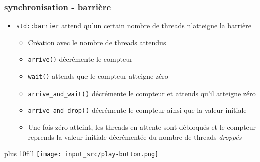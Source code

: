 \documentclass[C++.tex]{subfiles}
\begin{document}
\begin{frame}[fragile]
	\frametitle{synchronisation - barrière}
	\begin{itemize}
		\item \lstinline|std::barrier| attend qu'un certain nombre de threads n'atteigne la barrière
		\begin{itemize}
			\item Création avec le nombre de threads attendus
			\item \lstinline|arrive()| décrémente le compteur
			\item \lstinline|wait()| attends que le compteur atteigne zéro
			\item \lstinline|arrive_and_wait()| décrémente le compteur et attends qu'il atteigne zéro
			\item \lstinline|arrive_and_drop()| décrémente le compteur ainsi que la valeur initiale
			\item Une fois zéro atteint, les threads en attente sont débloqués et le compteur reprends la valeur initiale décrémentée du nombre de threads \og \textit{droppés}\fg{}
		\end{itemize}
	\end{itemize}

	\vskip 10mm plus 10fill
	\hfill
	\href{https://godbolt.org/#z:OYLghAFBqd5QCxAYwPYBMCmBRdBLAF1QCcAaPECAMzwBtMA7AQwFtMQByARg9KtQYEAysib0QXACx8BBAKoBnTAAUAHpwAMvAFYTStJg1DIApACYAQuYukl9ZATwDKjdAGFUtAK4sGe1wAyeAyYAHI%2BAEaYxCBmAGykAA6oCoRODB7evnrJqY4CQSHhLFEx8baY9vkMQgRMxASZPn5cFVXptfUEhWGR0XoKdQ1N2a2DXT3FpRIAlLaoXsTI7BzmAMzByN5YANQma25Og8SYrPvYJhoAguub25h7BxH1xHjR55c3ZhsMW167%2BzcBAQJyY6A%2B10%2BwQIOxYTGCEBmnxMAHYrNcdjs0AxBjtUgAvTAAfRhDAijwAIjsAKz7dFXTGDdAgEDPYivaI7CIQMlItb0z6YpheIg7ADuJAA1pS9tSrPETNSqRBoTs8EiMZitdrtaj6TqDTqmSy0CLHm5AXszGZsIITg9%2BKhzGZzZa8K6DlazIq3AxnXTBYagxEAHQvPAAN2JhnQRLF8IIiIDmqDBuNKAWMMBludAFk6G8vDtHc6PW41WWvT6/dbkwzUwbQ%2BGo0SY3GE0n%2BYGG9r06aswcc9ahCRHA7UE7rZX3dnPf7qb7/V2Uz3URS64G%2B5nK86KZg4eymMBMNWl/q8QRmSBtMDQegdgRFRYyYr18v6/xiBACcSYTO1lSGh0hWlovvyVryhY6qBnq3YPk%2BeCvjK6Y3iCpzoBAErEJKpBqny55rsiKLrtcHBzLQnDUrwfgcFopCoJwFqWNYeILEsDzrDwpAEJoZFzJKIDUho%2BicJI1G8fRnC8AoIDCTxtFkaQcCwEgmCqJgyAiiQ5CUPUwAKMohiVEICCoGKNFcWgLCJHQTDVIZIS0CZZk0XRVk2fQMTAFw1qkO5dDRKErArLw/meQA8iKznmRJakaVcxD6VJpBxcgtT4DRvD8IIIhiOwUgyIIigqOoCmkLorQGEYKDWNY%2Bh4BEMmwMwbCshOgykFGMTcCiVEzHMqCJNUMkcAAtEy%2BwUqYzGWGYGg7KNADqYi0Ati1qQQxBMAtiSYOghiOMgO23uh0lscsAyXsEDnGaZMXcLwm2YCsXFiltiS8eRlHiWVDEcNg6maUQxA7KoAAccSjXEkg7MAyBHT5IYuhATGQbhuCECQVprFwMyPZ9cwIOh/SIqQAlCSJHBiaQrm8H90mydxBOU2YP10fTTMKf1nXRKkziSEAA}{\texttt{[image: input\_src/play-button.png]}}
\end{frame}
\end{document}
